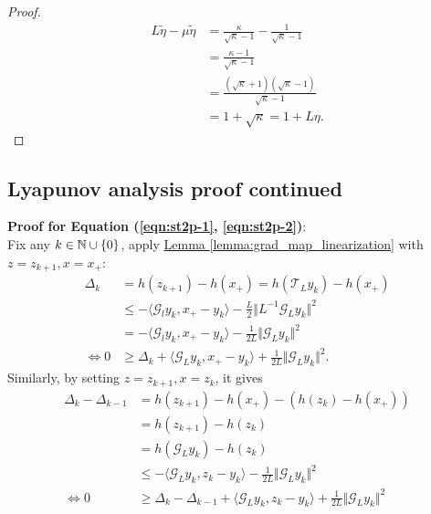 \documentclass[12pt]{article}
\begin{document}
\begin{proof}
            $$
            \begin{aligned}
                L\tilde \eta - \mu \tilde \eta 
                &= \frac{\kappa}{\sqrt{\kappa} - 1} - 
                \frac{1}{\sqrt{\kappa} - 1}
                \\
                &= 
                \frac{\kappa - 1}{\sqrt{\kappa} - 1}
                \\
                &= 
                \frac{(\sqrt{\kappa} + 1)(\sqrt{\kappa} - 1)}{\sqrt{\kappa} - 1}
                \\
                &= 1 + \sqrt{\kappa} = 1 + L \eta. 
            \end{aligned}
            $$
        \end{proof}
    \subsection{Lyapunov analysis proof continued}\label{sec:st2p_proof_continued}
        \textbf{Proof for Equation (\ref*{eqn:st2p-1}, \ref*{eqn:st2p-2})}:
        \\
        Fix any $k \in \mathbb N\cup \{0\}$, apply
        \hyperref[lemma:grad_map_linearization]
        {Lemma \ref*{lemma:grad_map_linearization}}
        with $z = z_{k + 1}, x = x_+$: 
        \begin{align*}
            \Delta_k &= h(z_{k + 1}) - h(x_+) = h(\mathcal T_L y_k) - h(x_+) 
            \\
            &\le 
            - \langle \mathcal G_l y_k, x_+ - y_k \rangle 
            - \frac{L}{2}\Vert L^{-1} \mathcal G_Ly_k\Vert^2
            \\
            &= 
            - \langle \mathcal G_l y_k, x_+ - y_k \rangle 
            - \frac{1}{2L}\Vert \mathcal G_L y_k\Vert^2
            \\
            \iff 
            0& \ge \Delta_k + \langle \mathcal G_L y_k, x_+ - y_k\rangle + \frac{1}{2L}\Vert \mathcal G_L y_k\Vert^2. 
        \end{align*}
        Similarly, by setting $z = z_{k + 1}, x = z_k$, it gives 
        \begin{align*}
            \Delta_k - \Delta_{k - 1} &= 
            h(z_{k + 1}) - h(x_+) - (h(z_k) - h(x_+)) 
            \\
            &= h(z_{k + 1}) - h(z_k)
            \\
            &= h( \mathcal G_L y_k) - h(z_k)
            \\
            &\le 
            - \langle \mathcal G_L y_k, z_k - y_k\rangle - 
            \frac{1}{2L} \Vert \mathcal G_L y_k \Vert^2
            \\
            \iff 
            0 &\ge
            \Delta_k - \Delta_{k - 1}
            + \langle \mathcal G_L y_k, z_k - y_k\rangle
            + \frac{1}{2L} \Vert \mathcal G_L y_k \Vert^2
        \end{align*}
\end{document}

